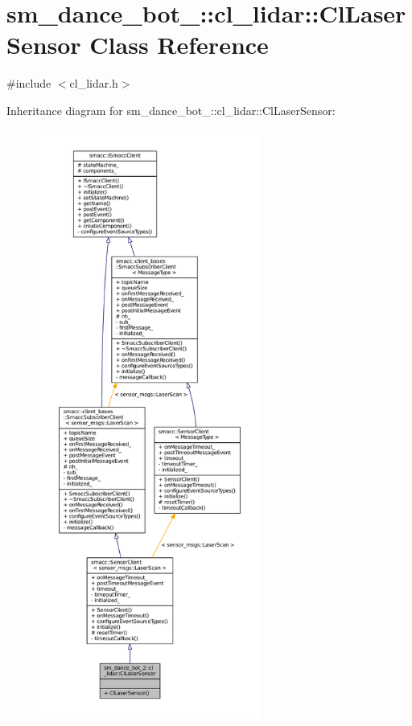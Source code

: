 \hypertarget{classsm__dance__bot__2_1_1cl__lidar_1_1ClLaserSensor}{}\section{sm\+\_\+dance\+\_\+bot\+\_\+:\+:cl\+\_\+lidar\+:\+:Cl\+Laser\+Sensor Class Reference}
\label{classsm__dance__bot__2_1_1cl__lidar_1_1ClLaserSensor}


{\ttfamily \#include $<$cl\+\_\+lidar.\+h$>$}



Inheritance diagram for sm\+\_\+dance\+\_\+bot\+\_\+:\+:cl\+\_\+lidar\+:\+:Cl\+Laser\+Sensor\+:
\nopagebreak
\begin{figure}[H]
\begin{center}
\leavevmode
\includegraphics[height=550pt]{classsm__dance__bot__2_1_1cl__lidar_1_1ClLaserSensor__inherit__graph}
\end{center}
\end{figure}


